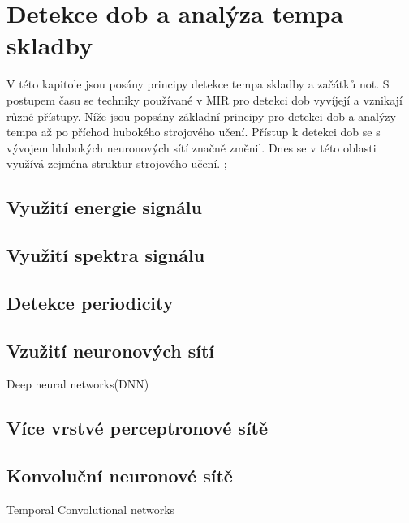 
\section{Detekce dob a analýza tempa skladby}
V této kapitole jsou posány principy detekce tempa skladby a začátků not.
S postupem času se techniky používané v \acs*{MIR} pro detekci dob vyvíjejí a vznikají různé přístupy.
Níže jsou popsány základní principy pro detekci dob a analýzy tempa až po příchod hubokého strojového učení.
Přístup k detekci dob se s vývojem hlubokých neuronových sítí značně změnil. 
Dnes se v této oblasti využívá zejména struktur strojového učení.
\cite{tempobeatdownbeat:book} \cite{fundamental_of_music_processing};


  \subsection{Využití energie signálu}

  \subsection{Využití spektra signálu}
  
  \subsection{Detekce periodicity}

  \subsection{Vzužití neuronových sítí}
    Deep neural networks(DNN)
  
  \subsection{Více vrstvé perceptronové sítě}

  \subsection{Konvoluční neuronové sítě}
    Temporal Convolutional networks
    
